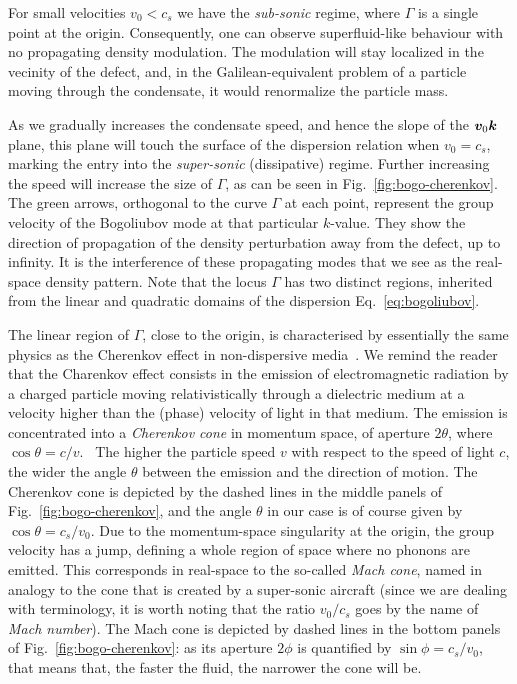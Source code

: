 For small velocities $v_0 < c_s$ we have the \textit{sub-sonic}
regime, where $\Gamma$ is a single point at the origin. Consequently,
one can observe superfluid-like behaviour with no propagating density
modulation. The modulation will stay localized in the vecinity of the
defect, and, in the Galilean-equivalent problem of a particle moving
through the condensate, it would renormalize the particle
mass.~\cite{Astrakharchik_2004}

As we gradually increases the condensate speed, and hence the slope of
the $\bm{v}_0 \bm{k}$ plane, this plane will touch the surface of the
dispersion relation when $v_0 = c_s$, marking the entry into the
\textit{super-sonic} (dissipative) regime. Further increasing the
speed will increase the size of $\Gamma$, as can be seen in
Fig.~\ref{fig:bogo-cherenkov}. The green arrows, orthogonal to the
curve $\Gamma$ at each point, represent the group velocity of the
Bogoliubov mode at that particular $k$-value. They show the direction
of propagation of the density perturbation away from the defect, up to
infinity. It is the interference of these propagating modes that we
see as the real-space density pattern. Note that the locus $\Gamma$
has two distinct regions, inherited from the linear and quadratic
domains of the dispersion Eq.~\eqref{eq:bogoliubov}.

The linear region of $\Gamma$, close to the origin, is characterised
by essentially the same physics as the Cherenkov effect in
non-dispersive media~\cite{Landau:712712}. We remind the reader that
the Charenkov effect consists in the emission of electromagnetic
radiation by a charged particle moving relativistically through a
dielectric medium at a velocity higher than the (phase) velocity of
light in that medium. The emission is concentrated into a
\textit{Cherenkov cone} in momentum space, of aperture $2\theta$,
where $\cos\theta = c/v$.~\cite{jelley1958vcerenkov} The higher the
particle speed $v$ with respect to the speed of light $c$, the wider
the angle $\theta$ between the emission and the direction of
motion. The Cherenkov cone is depicted by the dashed lines in the
middle panels of Fig.~\ref{fig:bogo-cherenkov}, and the angle $\theta$
in our case is of course given by $\cos\theta = c_s/v_0$. Due to the
momentum-space singularity at the origin, the group velocity has a
jump, defining a whole region of space where no phonons are
emitted. This corresponds in real-space to the so-called \textit{Mach
  cone}, named in analogy to the cone that is created by a super-sonic
aircraft (since we are dealing with terminology, it is worth noting
that the ratio $v_0/c_s$ goes by the name of \textit{Mach
  number}). The Mach cone is depicted by dashed lines in the bottom
panels of Fig.~\ref{fig:bogo-cherenkov}: as its aperture $2\phi$ is
quantified by $\sin\phi = c_s/v_0$, that means that, the faster the
fluid, the narrower the cone will be.

